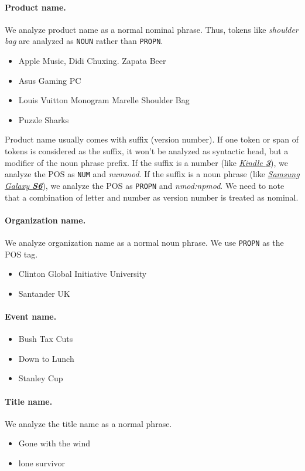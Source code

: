 \documentclass[11pt,a4paper]{article}
\begin{document}
\paragraph{Product name.}
We analyze product name as a normal nominal phrase.
Thus, tokens like \textit{shoulder bag} are analyzed as \texttt{NOUN} rather than \texttt{PROPN}.
\begin{itemize}
	\item Apple Music, Didi Chuxing. Zapata Beer
	\item Asus Gaming PC
	\item Louis Vuitton Monogram Marelle Shoulder Bag
	\item Puzzle Sharks
\end{itemize}

Product name usually comes with suffix (version number).
If one token or span of tokens is considered as the suffix, 
it won't be analyzed as syntactic head, but a modifier of the noun phrase prefix.
If the suffix is a number (like \underline{\textit{Kindle \textbf{3}}}), we analyze the POS as \texttt{NUM} and \textit{nummod}.
If the suffix is a noun phrase (like \underline{\textit{Samsung Galaxy \textbf{S6}}}), we analyze the POS as \texttt{PROPN} and \textit{nmod:npmod}.
We need to note that a combination of letter and number as version number is treated as nominal.

\paragraph{Organization name.} 
We analyze organization name as a normal noun phrase.
We use \texttt{PROPN} as the POS tag.
\begin{itemize}
	\item Clinton Global Initiative University
	\item Santander UK
\end{itemize}

\paragraph{Event name.}
\begin{itemize}
	\item Bush Tax Cuts
	\item Down to Lunch
	\item Stanley Cup
\end{itemize}

\paragraph{Title name.}
We analyze the title name as a normal phrase.
\begin{itemize}
	\item Gone with the wind
	\item lone survivor
\end{itemize}
\end{document}
